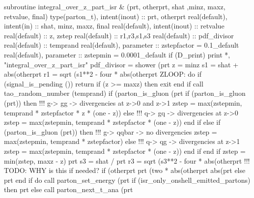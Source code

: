       subroutine integral_over_z_part_isr &
           (prt, otherprt, shat ,minz, maxz, retvalue, final)
        type(parton_t), intent(inout) :: prt, otherprt
        real(default), intent(in) :: shat, minz, maxz, final
        real(default), intent(inout) :: retvalue
        real(default) :: z, zstep
        real(default) :: r1,r3,s1,s3
        real(default) :: pdf_divisor
        real(default) :: temprand
        real(default), parameter :: zstepfactor = 0.1_default
        real(default), parameter :: zstepmin = 0.0001_default
        if (D_print) print *, "integral_over_z_part_isr"
        pdf_divisor = shower%
             (prt%
        z = minz
        s1 = shat + abs(otherprt%
        r1 = sqrt (s1**2 - four * abs(otherprt%
        ZLOOP: do
           if (signal_is_pending ()) return
           if (z >= maxz) then
              exit
           end if
           call tao_random_number (temprand)
           if (parton_is_gluon (prt%
              if (parton_is_gluon (prt)) then
                 !!! g-> gg -> divergencies at z->0 and z->1
                 zstep = max(zstepmin, temprand * zstepfactor * z * (one - z))
              else
                 !!! q-> gq -> divergencies at z->0
                 zstep = max(zstepmin, temprand * zstepfactor * (one - z))
              end if
           else
              if (parton_is_gluon (prt)) then
                 !!! g-> qqbar -> no divergencies
                 zstep = max(zstepmin, temprand * zstepfactor)
              else
                 !!! q-> qg -> divergencies at z->1
                 zstep = max(zstepmin, temprand * zstepfactor * (one - z))
              end if
           end if
           zstep = min(zstep, maxz - z)
           prt%
           s3 = shat / prt%
           r3 = sqrt (s3**2 - four * abs(otherprt%
           !!! TODO: WHY is this if needed?
           if (otherprt%
              prt%
                   (two * abs(otherprt%
                   abs(prt%
           else
              prt%
           end if
           do
              call parton_set_energy (prt%
              if (isr_only_onshell_emitted_partons) then
                 prt%
              else
                 call parton_next_t_ana (prt%
